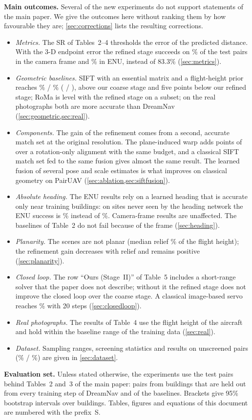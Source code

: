 \noindent\textbf{Main outcomes.} Several of the new experiments do not support statements of the main paper. We give the outcomes here without ranking them by how favourable they are; \cref{sec:corrections} lists the resulting corrections.
\begin{itemize}[leftmargin=*,itemsep=1pt,topsep=3pt]
\item \emph{Metrics.} The SR of Tables~2--4 thresholds the error of the predicted distance. With the 3-D endpoint error the refined stage succeeds on \SiiCamSRe\% of the test pairs in the camera frame and \SiiEnuSRe\% in ENU, instead of 83.3\% (\cref{sec:metrics}).
\item \emph{Geometric baselines.} SIFT with an essential matrix and a flight-height prior reaches \sfSiftSRd\% / \sfSiftSRe\% (\SRd{} / \SRe), above our coarse stage and five points below our refined stage; RoMa is level with the refined stage on a subset; on the real photographs both are more accurate than DreamNav (\cref{sec:geometric,sec:real}).
\item \emph{Components.} The gain of the refinement comes from a second, accurate match set at the original resolution. The plane-induced warp adds \ctPlaneGainSRe{} points of \SRe{} over a rotation-only alignment with the same budget, and a classical SIFT match set fed to the same fusion gives almost the same result. The learned fusion of several pose and scale estimates is what improves on classical geometry on PairUAV (\cref{sec:ablation,sec:siftfusion}).
\item \emph{Absolute heading.} The ENU results rely on a learned heading that is accurate only near training buildings: on sites never seen by the heading network the ENU success is \hdSdUnseenSRe\% instead of \hdSdSeenSRe\%. Camera-frame results are unaffected. The baselines of Table~2 do not fail because of the frame (\cref{sec:heading}).
\item \emph{Planarity.} The scenes are not planar (median relief \plReliefMed\% of the flight height); the refinement gain decreases with relief and remains positive (\cref{sec:planarity}).
\item \emph{Closed loop.} The row ``Ours (Stage~II)'' of Table~5 includes a short-range solver that the paper does not describe; without it the refined stage does not improve the closed loop over the coarse stage. A classical image-based servo reaches \svIbvsFinal\% with 20 steps (\cref{sec:closedloop}).
\item \emph{Real photographs.} The results of Table~4 use the flight height of the aircraft and hold within the baseline range of the training data (\cref{sec:real}).
\item \emph{Dataset.} Sampling ranges, screening statistics and results on unscreened pairs (\unSiiSRd\% / \unSiiSRe\%) are given in \cref{sec:dataset}.
\end{itemize}

\noindent\textbf{Evaluation set.} Unless stated otherwise, the experiments use the test pairs behind Tables~2 and~3 of the main paper: \nTest{} pairs from \nBuildings{} buildings that are held out from every training step of DreamNav and of the baselines. Brackets give 95\% bootstrap intervals over buildings. Tables, figures and equations of this document are numbered with the prefix~S.
